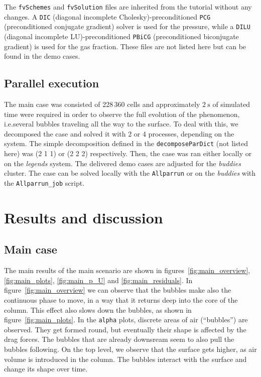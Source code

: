 \documentclass[11pt, a4paper, twoside]{article}
\begin{document}
The \texttt{fvSchemes} and \texttt{fvSolution} files are inherited from the tutorial without any changes. A \texttt{DIC} (diagonal incomplete Cholesky)-preconditioned \texttt{PCG} (preconditioned conjugate gradient) solver is used for the pressure, while a \texttt{DILU} (diagonal incomplete LU)-preconditioned \texttt{PBiCG} (preconditioned biconjugate gradient) is used for the gas fraction. These files are not listed here but can be found in the demo cases.

\subsection{Parallel execution}
The main case was consisted of 228\,360 cells and approximately $\SI{2}{\second}$ of simulated time were required in order to observe the full evolution of the phenomenon, i.e.\@ several bubbles traveling all the way to the surface. To deal with this, we decomposed the case and solved it with 2 or 4 processes, depending on the system. The simple decomposition defined in the \texttt{decomposeParDict} (not listed here) was (2 1 1) or (2 2 2) respectively. Then, the case was ran either locally or on the \emph{legends} system. The delivered demo cases are adjusted for the \emph{buddies} cluster. The case can be solved locally with the \texttt{Allparrun} or on the \emph{buddies} with the \texttt{Allparrun\_job} script.

\section{Results and discussion}

\subsection{Main case}
The main results of the main scenario are shown in figures~\ref{fig:main_overview}, \ref{fig:main_plots}, \ref{fig:main_p_U} and \ref{fig:main_residuals}. In figure~\ref{fig:main_overview} we can observe that the bubbles make also the continuous phase to move, in a way that it returns deep into the core of the column. This effect also slows down the bubbles, as shown in figure~\ref{fig:main_plots}. In the \texttt{alpha} plots, discrete areas of air (``bubbles'') are observed. They get formed round, but eventually their shape is affected by the drag forces. The bubbles that are already downsream seem to also pull the bubbles following. On the top level, we observe that the surface gets higher, as air volume is introduced in the column. The bubbles interact with the surface and change its shape over time.
\end{document}
